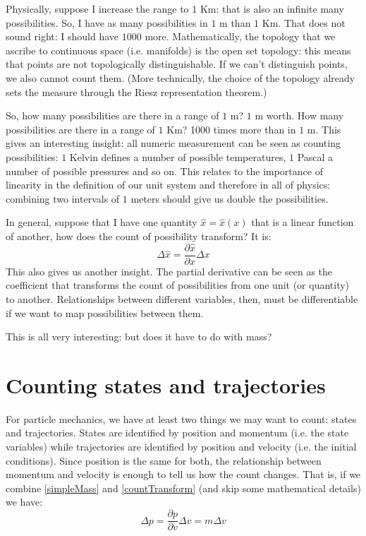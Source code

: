 \documentclass[aps,pra,10pt,floatfix,nofootinbib]{revtex4-1}
\theoremstyle{definition}
\begin{document}
Physically, suppose I increase the range to $1$ Km: that is also an infinite many possibilities. So, I have as many possibilities in $1$ m than $1$ Km. That does not sound right: I should have $1000$ more. Mathematically, the topology that we ascribe to continuous space (i.e. manifolds) is the open set topology: this means that points are not topologically distinguishable. If we can't distinguish points, we also cannot count them. (More technically, the choice of the topology already sets the measure through the Riesz representation theorem.)

So, how many possibilities are there in a range of $1$ m? $1$ m worth. How many possibilities are there in a range of $1$ Km? 1000 times more than in $1$ m. This gives an interesting insight: all numeric measurement can be seen as counting possibilities: $1$ Kelvin defines a number of possible temperatures, $1$ Pascal a number of possible pressures and so on. This relates to the importance of linearity in the definition of our unit system and therefore in all of physics: combining two intervals of $1$ meters should give us double the possibilities.

In general, suppose that I have one quantity $\hat{x}=\hat{x}(x)$ that is a linear function of another, how does the count of possibility transform? It is:
\begin{equation}
\label{countTransform}
\Delta \hat{x} = \frac{\partial \hat{x}}{\partial x} \Delta x
\end{equation}
This also gives us another insight. The partial derivative can be seen as the coefficient that transforms the count of possibilities from one unit (or quantity) to another. Relationships between different variables, then, must be differentiable if we want to map possibilities between them.

This is all very interesting: but does it have to do with mass?

\section{Counting states and trajectories}

For particle mechanics, we have at least two things we may want to count: states and trajectories. States are identified by position and momentum (i.e. the state variables) while trajectories are identified by position and velocity (i.e. the initial conditions). Since position is the same for both, the relationship between momentum and velocity is enough to tell us how the count changes. That is, if we combine \eqref{simpleMass} and \eqref{countTransform} (and skip some mathematical details) we have:
\begin{equation}
\label{stateCountTransform}
\Delta p = \frac{\partial p}{\partial v} \Delta v = m \Delta v
\end{equation}
\end{document}
